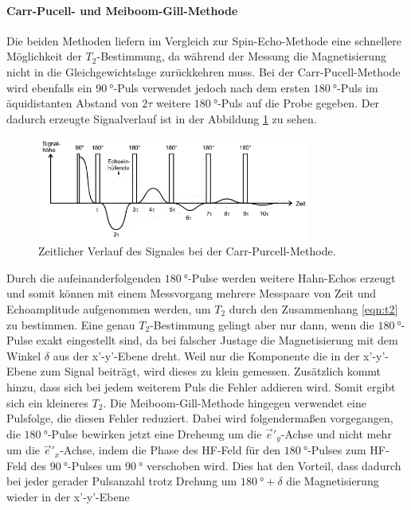 \paragraph{Carr-Pucell- und Meiboom-Gill-Methode}
Die beiden Methoden liefern im Vergleich zur Spin-Echo-Methode eine
schnellere Möglichkeit der $T_2$-Bestimmung, da während der Messung die Magnetisierung
nicht in die Gleichgewichtslage zurückkehren muss.
Bei der Carr-Pucell-Methode wird ebenfalls ein $\SI{90}{\degree}$-Puls
verwendet jedoch nach dem ersten $\SI{180}{\degree}$-Puls
im äquidistanten Abstand von $2\tau$ weitere $\SI{180}{\degree}$-Puls
auf die Probe gegeben. Der dadurch erzeugte Signalverlauf
ist in der Abbildung \ref{fig:carr-pu} zu sehen.
\begin{figure}
  \centering
  \includegraphics[width=0.8\textwidth]{carr-pu.PNG}
  \caption{Zeitlicher Verlauf des Signales bei der Carr-Purcell-Methode.\cite{sample}}
  \label{fig:carr-pu}
\end{figure}
Durch die aufeinanderfolgenden $\SI{180}{\degree}$-Pulse werden
weitere Hahn-Echos erzeugt und
somit können mit einem Messvorgang mehrere Messpaare von Zeit und
Echoamplitude aufgenommen werden, um $T_2$ durch den Zusammenhang \eqref{eqn:t2} zu bestimmen.
Eine genau $T_2$-Bestimmung gelingt aber nur dann,
wenn die $\SI{180}{\degree}$-Pulse exakt eingestellt sind, da
bei falscher Justage die Magnetisierung mit dem Winkel $\delta$ aus der x'-y'-Ebene
dreht. Weil nur die Komponente die in der x'-y'-Ebene zum Signal beiträgt,
wird dieses zu klein gemessen. Zusätzlich kommt hinzu, dass
sich bei jedem weiterem Puls die Fehler addieren wird.
Somit ergibt sich ein kleineres $T_2$.
Die Meiboom-Gill-Methode hingegen verwendet eine
Pulsfolge, die diesen Fehler reduziert. Dabei wird folgendermaßen
vorgegangen, die $\SI{180}{\degree}$-Pulse bewirken
jetzt eine Dreheung um die $\vec{e}'_y$-Achse und nicht mehr
um die $\vec{e}'_x$-Achse, indem die Phase des HF-Feld
für den $\SI{180}{\degree}$-Pulses zum HF-Feld des $\SI{90}{\degree}$-Pulses
um $\SI{90}{\degree}$ verschoben wird.
Dies hat den Vorteil, dass dadurch bei jeder
gerader Pulsanzahl trotz Drehung
um $\SI{180}{\degree}+\delta$ die Magnetisierung wieder in der x'-y'-Ebene
